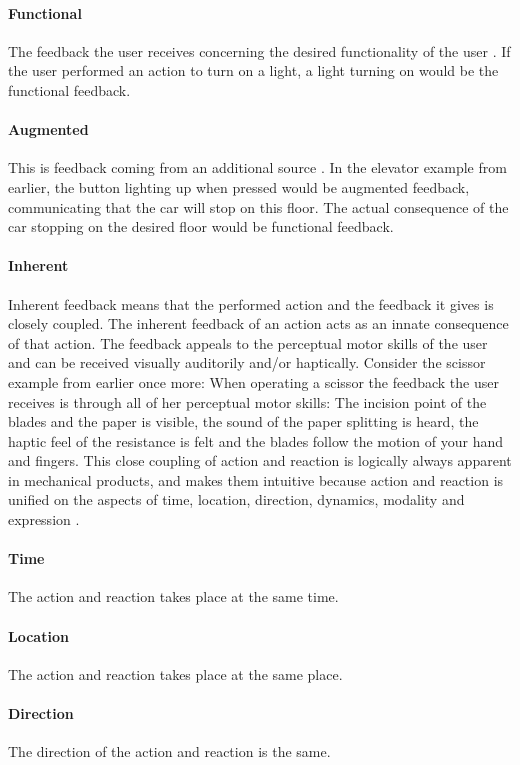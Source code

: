 \paragraph{Functional} The feedback the user receives concerning the desired functionality of the user \cite{frogger}. If the user performed an action to turn on a light, a light turning on would be the functional feedback.
\paragraph{Augmented} This is feedback coming from an additional source \cite{frogger}. In the elevator example from earlier, the button lighting up when pressed would be augmented feedback, communicating that the car will stop on this floor. The actual consequence of the car stopping on the desired floor would be functional feedback.
\paragraph{Inherent} Inherent feedback means that the performed action and the feedback it gives is closely coupled. The inherent feedback of an action acts as an innate consequence of that action. The feedback appeals to the perceptual motor skills of the user and can be received visually auditorily and/or haptically. Consider the scissor example from earlier once more: When operating a scissor the feedback the user receives is through all of her perceptual motor skills: The incision point of the blades and the paper is visible, the sound of the paper splitting is heard, the haptic feel of the resistance is felt and the blades follow the motion of your hand and fingers. This close coupling of action and reaction is logically always apparent in mechanical products, and makes them intuitive because action and reaction is unified on the aspects of time, location, direction, dynamics, modality and expression \cite{frogger}.
\paragraph{Time} The action and reaction takes place at the same time.
\paragraph{Location} The action and reaction takes place at the same place.
\paragraph{Direction} The direction of the action and reaction is the same.
